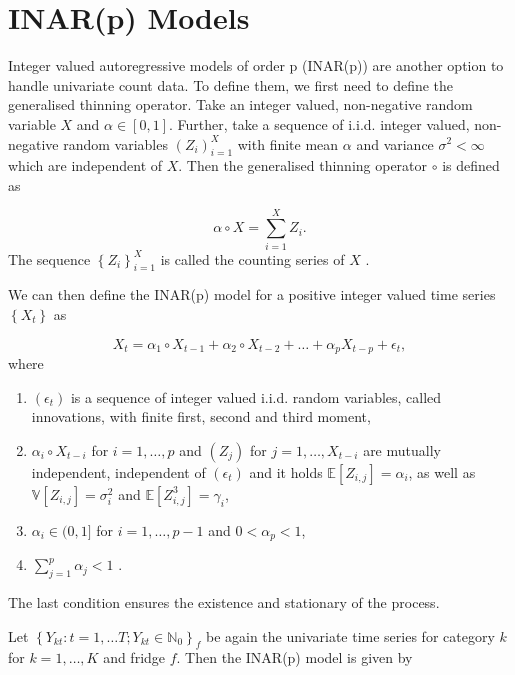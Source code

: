 \section{INAR(p) Models}
\label{sec: Inar Models}

Integer valued autoregressive models of order p (INAR(p)) are another option to handle univariate count data. To define them, we first need to define the generalised thinning operator. Take an integer valued, non-negative random variable $X$ and $\alpha \in [0,1]$. Further, take a sequence of i.i.d. integer valued, non-negative random variables $(Z_i)_{i=1}^X$ with finite mean $\alpha$ and variance $\sigma^2<\infty $ which are independent of $X$. Then the generalised thinning operator $\circ$ is defined as

\begin{equation}
\alpha \circ X = \sum_{i=1}^X Z_i .
\label{eq:Thinning operator}
\end{equation}
%
The sequence  $\left\{Z_i \right\}_{i=1}^X$ is called the counting series of $X$ \textcite{Silva:2005}. 

We can then define the INAR(p) model for a positive integer valued time series $\left\{X_t \right\}$ as

\begin{equation}
X_t = \alpha_1 \circ X_{t-1} + \alpha_2 \circ X_{t-2} + \ldots + \alpha_p X_{t-p} +\epsilon_t ,
\label{eq:Inar(p) model}
\end{equation}
%
where

\begin{enumerate}
	\item $(\epsilon_t)$ is a sequence of integer valued i.i.d. random variables, called innovations, with finite first, second and third moment, 
	\item $\alpha_i \circ X_{t-i}$ for $i= 1,\ldots,p$ and $(Z_j)$ for $j=1,\ldots,X_{t-i}$ are mutually independent, independent of $(\epsilon_t)$ and it holds $\mathbb{E}[Z_{i,j}]=\alpha_i$, as well as $\mathbb{V}[Z_{i,j}] = \sigma_i^2$ and $\mathbb{E}[Z_{i,j}^3] = \gamma_i$,
	\item $\alpha_i \in (0,1]$ for $i=1,\ldots,p-1$ and $0 < \alpha_p < 1$,
	\item $\sum_{j=1}^p \alpha_j < 1$ \textcite{Silva:2005}. 
\end{enumerate}


The last condition ensures the existence and stationary of the process. 

Let $\left\{Y_{kt}:t=1,\ldots T; Y_{kt} \in \mathbb{N}_0\right\}_f$ be again the univariate time series for category $k$ for $k=1,\ldots,K$ and fridge $f$. Then the INAR(p) model is given by

